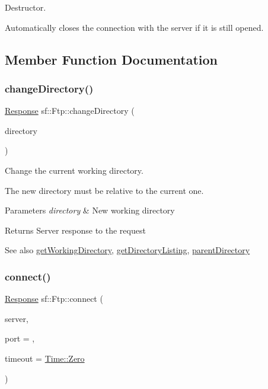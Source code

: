Destructor. 

Automatically closes the connection with the server if it is still opened. 

\subsection{Member Function Documentation}
\mbox{\label{classsf_1_1_ftp_a7e93488ea6330dd4dd76e428da9bb6d3}} 
\subsubsection{\texorpdfstring{change\+Directory()}{changeDirectory()}}
{\footnotesize\ttfamily \hyperlink{classsf_1_1_ftp_1_1_response}{Response} sf\+::\+Ftp\+::change\+Directory (\begin{DoxyParamCaption}\item[{const std\+::string \&}]{directory }\end{DoxyParamCaption})}



Change the current working directory. 

The new directory must be relative to the current one.


\begin{DoxyParams}{Parameters}
{\em directory} & New working directory\\
\hline
\end{DoxyParams}
\begin{DoxyReturn}{Returns}
Server response to the request
\end{DoxyReturn}
\begin{DoxySeeAlso}{See also}
\hyperlink{classsf_1_1_ftp_a79c654fcdd0c81e68c4fa29af3b45e0c}{get\+Working\+Directory}, \hyperlink{classsf_1_1_ftp_a8f37258e461fcb9e2a0655e9df0be4a0}{get\+Directory\+Listing}, \hyperlink{classsf_1_1_ftp_ad295cf77f30f9ad07b5c401fd9849189}{parent\+Directory} 
\end{DoxySeeAlso}
\mbox{\label{classsf_1_1_ftp_af02fb3de3f450a50a27981961c69c860}} 
\subsubsection{\texorpdfstring{connect()}{connect()}}
{\footnotesize\ttfamily \hyperlink{classsf_1_1_ftp_1_1_response}{Response} sf\+::\+Ftp\+::connect (\begin{DoxyParamCaption}\item[{const \hyperlink{classsf_1_1_ip_address}{Ip\+Address} \&}]{server,  }\item[{unsigned short}]{port = {},  }\item[{\hyperlink{classsf_1_1_time}{Time}}]{timeout = {\ttfamily \hyperlink{classsf_1_1_time_a8db127b632fa8da21550e7282af11fa0}{Time\+::\+Zero}} }\end{DoxyParamCaption})}



